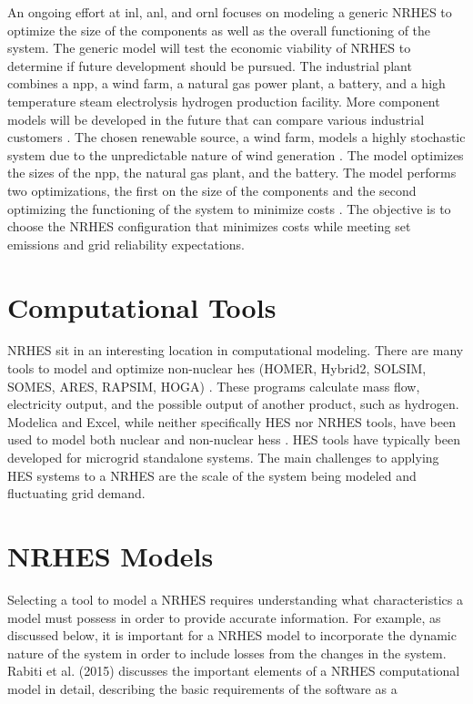 An ongoing effort at \ac{inl}, \ac{anl}, and \ac{ornl} focuses on modeling a generic NRHES to optimize the size of the components as well as the overall functioning of the system. The generic model will test the economic viability of NRHES to determine if future development should be pursued. The industrial plant combines a \ac{npp}, a wind farm, a natural gas power plant, a battery, and a high temperature steam electrolysis hydrogen production facility. More component models will be developed in the future that can compare various industrial customers \cite{Harrison2016}. The chosen renewable source, a wind farm, models a highly stochastic system due to the unpredictable nature of wind generation \cite{Chen2016_wind}. The model optimizes the sizes of the \ac{npp}, the natural gas plant, and the battery. The model performs two optimizations, the first on the size of the components and the second optimizing the functioning of the system to minimize costs \cite{redfoot_rabiti_2018}. The objective is to choose the NRHES configuration that minimizes costs while meeting set emissions and grid reliability expectations.

\section{Computational Tools}
NRHES sit in an interesting location in computational modeling. There are many tools to model and optimize non-nuclear \ac{hes} (HOMER, Hybrid2, SOLSIM, SOMES, ARES, RAPSIM, HOGA) \cite {Bernal-Agustin2009}. These programs calculate mass flow, electricity output, and the possible output of another product, such as hydrogen. Modelica and Excel, while neither specifically HES nor NRHES tools, have been used to model both nuclear and non-nuclear \ac{hes}s \cite{Shropshire2012, Chen2016, Binder2014, Garcia2015, Epiney2016}. HES tools have typically been developed for microgrid standalone systems. The main challenges to applying HES systems to a NRHES are the scale of the system being modeled and fluctuating grid demand.

\section{NRHES Models}
Selecting a tool to model a NRHES requires understanding what characteristics a model must possess in order to provide accurate information. For example, as discussed below, it is important for a NRHES model to incorporate the dynamic nature of the system in order to include losses from the changes in the system. Rabiti et al. (2015) discusses the important elements of a NRHES computational model in detail, describing the basic requirements of the software as a

